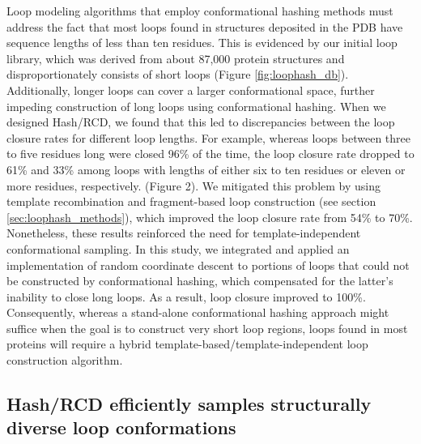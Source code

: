 Loop modeling algorithms that employ conformational hashing methods must address the fact that most loops found in structures deposited in the PDB have sequence lengths of less than ten residues. This is evidenced by our initial loop library, which was derived from about 87,000 protein structures and disproportionately consists of short loops (Figure \ref{fig:loophash_db}). Additionally, longer loops can cover a larger conformational space, further impeding construction of long loops using conformational hashing. When we designed Hash/RCD, we found that this led to discrepancies between the loop closure rates for different loop lengths. For example, whereas loops between three to five residues long were closed 96\% of the time, the loop closure rate dropped to 61\% and 33\% among loops with lengths of either six to ten residues or eleven or more residues, respectively. (Figure 2). We mitigated this problem by using template recombination and fragment-based loop construction (see section \ref{sec:loophash_methods}), which improved the loop closure rate from 54\% to 70\%. Nonetheless, these results reinforced the need for template-independent conformational sampling. In this study, we integrated and applied an implementation of random coordinate descent to portions of loops that could not be constructed by conformational hashing, which compensated for the latter’s inability to close long loops. As a result, loop closure improved to 100\%. Consequently, whereas a stand-alone conformational hashing approach might suffice when the goal is to construct very short loop regions, loops found in most proteins will require a hybrid template-based/template-independent loop construction algorithm.

\subsection{Hash/RCD efficiently samples structurally diverse loop conformations}

